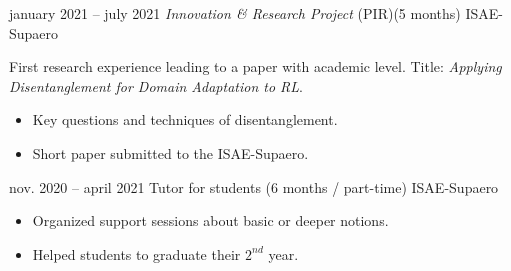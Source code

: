 \documentclass[
	a4paper,
]{fortysecondscv}
\begin{document}
\begin{cvtable}[4]
{			
    	}
	\cvitem
    	{january 2021 -- july 2021}
    	{\textit{Innovation \& Research Project} (PIR)\newline (5 months)}
    	{ISAE-Supaero}
    	{
    	    First research experience leading to a paper with academic level.\newline
            Title: \textit{Applying Disentanglement for Domain Adaptation to RL}.
            \begin{itemize}
                \item Key questions and techniques of disentanglement.
                \item Short paper submitted to the ISAE-Supaero.
            \end{itemize}
    	}
	\cvitem
    	{nov. 2020 -- april 2021}
    	{Tutor for students \newline (6 months / part-time)}
    	{ISAE-Supaero}
    	{
    	    \begin{itemize}
            	\item Organized support sessions about basic or deeper notions.
            	\item Helped students to graduate their $2^{nd}$ year.
    	    \end{itemize}
    	}
\end{cvtable}
\cvsignature
\end{document}
